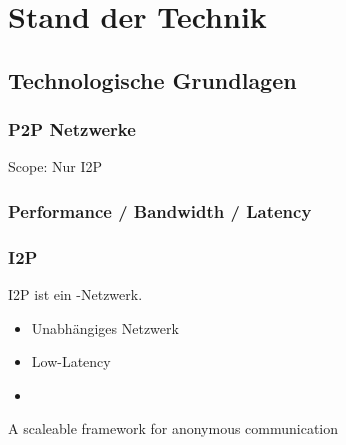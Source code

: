 \chapter{Stand der Technik}\label{ch:StandDerTechnik}



\section{Technologische Grundlagen}

\subsection{P2P Netzwerke}

Scope: Nur I2P

\subsection{Performance / Bandwidth / Latency}

\subsection{I2P}

I2P ist ein -Netzwerk.

\begin{itemize}
    \item Unabhängiges Netzwerk
    \item Low-Latency
    \item {}
\end{itemize}

\cite{astolfi_i2p_2015}
\cite{astolfi_i2p_nodate}

\cite{timpanaro_birds_2012}

\cite{timpanaro_evaluation_2015}

A scaleable framework for anonymous communication
\cite{noauthor_i2p_nodate-8}


